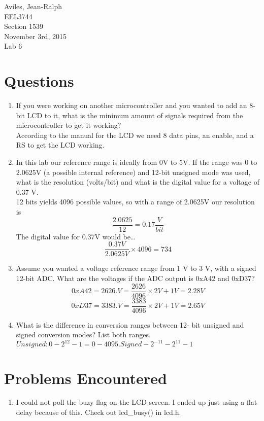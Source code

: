 \documentclass[letterpaper, 12pt]{article}
\newcommand{\hwnumber}{Lab 6}
\newcommand{\duedate}{November 3rd, 2015}
\newcommand{\capper}{\begin{flushright}Aviles, Jean-Ralph \\ EEL3744 \\ Section 1539 \\ \duedate{} \\ \hwnumber{}\end{flushright}}
\begin{document}
\capper{}
\section*{Questions}
\begin {enumerate}
    \item If you were working on another microcontroller and you
      wanted to add an 8-bit LCD to it, what is the minimum
      amount of signals required from the microcontroller to get
      it working? \\
      \hspace*{8pt} According to the manual for the LCD we need 8 data pins, an enable, and a RS to get the LCD working.
    \item In this lab our reference range is ideally from 0V to 5V. If
      the range was 0 to 2.0625V (a possible internal reference)
      and 12-bit unsigned mode was used, what is the resolution
      (volts/bit) and what is the digital value for a voltage of 0.37
      V. \\
      \hspace*{8pt} 12 bits yields 4096 possible values, so with a range of 2.0625V our resolution is \begin{equation} \frac{2.0625}{12} = 0.17\frac{V}{bit} \end{equation}
      The digital value for 0.37V would be\dots \begin{equation} \frac{0.37V}{2.0625V}\times4096 = 734 \end{equation}
    \item Assume you wanted a voltage reference range from 1 V to
      3 V, with a signed 12-bit ADC. What are the voltages if
      the ADC output is 0xA42 and 0xD37?
      \begin{equation} 0xA42 = 2626. V = \frac{2626}{4096}\times2V + 1V = 2.28V  \end{equation}
      \begin{equation} 0xD37 = 3383. V = \frac{3383}{4096}\times2V + 1V = 2.65V \end{equation}
    \item What is the difference in conversion ranges between 12-
      bit unsigned and signed conversion modes? List both
      ranges. \\
      $ Unsigned: 0 - 2^{12}-1 = 0 - 4095. Signed -2^{-11} - 2^{11}-1 $
\end{enumerate}
\section*{Problems Encountered}
\begin{enumerate}
  \item I could not poll the buzy flag on the LCD screen. I ended up just using a flat delay because of this. Check out lcd\_busy() in lcd.h.
\end{enumerate}
\end{document}
